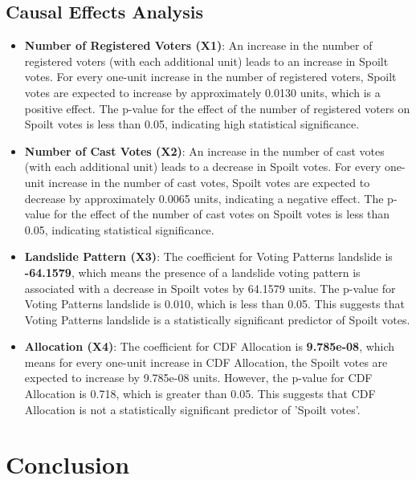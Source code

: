\documentclass[fleqn,a4paper,12pt]{article}
\begin{document}
\subsection{Causal Effects Analysis}

\begin{itemize}
\item \textbf{Number of Registered Voters (X1)}:
An increase in the number of registered voters (with each additional unit) leads to an increase in Spoilt votes. For every one-unit increase in the number of registered voters, Spoilt votes are expected to increase by approximately 0.0130 units, which is a positive effect. The p-value for the effect of the number of registered voters on Spoilt votes is less than 0.05, indicating high statistical significance.
\item \textbf{Number of Cast Votes (X2)}:
An increase in the number of cast votes (with each additional unit) leads to a decrease in Spoilt votes. For every one-unit increase in the number of cast votes, Spoilt votes are expected to decrease by approximately 0.0065 units, indicating a negative effect. The p-value for the effect of the number of cast votes on Spoilt votes is less than 0.05, indicating statistical significance.
\end{itemize}

\begin{itemize}
\item \textbf{Landslide Pattern (X3)}: The coefficient for Voting Patterns landslide is \textbf{-64.1579}, which means the presence of a landslide voting pattern is associated with a decrease in Spoilt votes by 64.1579 units. The p-value for Voting Patterns landslide is 0.010, which is less than 0.05. This suggests that Voting Patterns landslide is a statistically significant predictor of Spoilt votes.
\item \textbf{Allocation (X4)}: The coefficient for CDF Allocation is \textbf{9.785e-08}, which means for every one-unit increase in CDF Allocation, the Spoilt votes are expected to increase by 9.785e-08 units. However, the p-value for CDF Allocation is 0.718, which is greater than 0.05. This suggests that CDF Allocation is not a statistically significant predictor of 'Spoilt votes'.
\end{itemize}
 

\section{Conclusion}
\end{document}
